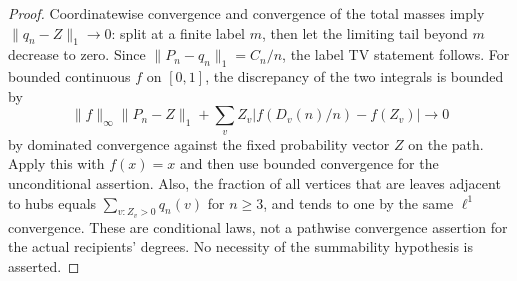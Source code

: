 \documentclass[11pt]{article}
\newcommand{\sectag}[1]{\renewcommand{\thesection}{#1}\renewcommand{\theHsection}{#1}}
\theoremstyle{remark}
\numberwithin{equation}{section}
\begin{document}
\begin{proof}
Coordinatewise convergence and convergence of the total masses imply $\|q_n-Z\|_1\to0$: split at a finite label $m$, then let the limiting tail beyond $m$ decrease to zero. Since $\|P_n-q_n\|_1=C_n/n$, the label TV statement follows. For bounded continuous $f$ on $[0,1]$, the discrepancy of the two integrals is bounded by
\[
 \|f\|_\infty\|P_n-Z\|_1+\sum_v Z_v|f(D_v(n)/n)-f(Z_v)|\longrightarrow0
\]
by dominated convergence against the fixed probability vector $Z$ on the path. Apply this with $f(x)=x$ and then use bounded convergence for the unconditional assertion. Also, the fraction of all vertices that are leaves adjacent to hubs equals $\sum_{v:Z_v>0}q_n(v)$ for $n\ge3$, and tends to one by the same $\ell^1$ convergence. These are conditional laws, not a pathwise convergence assertion for the actual recipients' degrees. No necessity of the summability hypothesis is asserted.
\end{proof}

\sectag{SPA}
\end{document}
